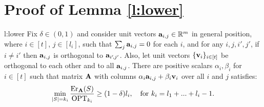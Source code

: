 \documentclass{article}
\begin{document}
\section{Proof of Lemma \ref{l:lower}}
\begin{replemma}{l:lower}
Fix $\delta\in(0,1)$ and consider unit vectors
$\mathbf a_{i,j}\in\mathbb R^m$ in general position, where $i\in[t]$, $j\in[l_i]$, such that
$\sum_j\mathbf a_{i,j}=0$ for each $i$, and for any $i,j,i',j'$, if $i\ne i'$
then $\mathbf a_{i,j}$ is orthogonal to $\mathbf a_{i'\!,j'}$. Also, let unit vectors
$\{\mathbf v_i\}_{i\in[t]}$ be orthogonal to  each other and to all
$\mathbf a_{i,j}$. There are positive scalars $\alpha_{i},\beta_i$ for $ i \in [t]$
such that matrix $\mathbf A$ with columns 
$\alpha_{i}\mathbf a_{i,j}+\beta_i\mathbf v_i$ over all $i$ and $j$ satisfies: 
\begin{align*}
  \min_{|S|=k_i}\frac{\mathrm{Er}_\mathbf A(S)}{\mathrm{OPT}_{k_i}}\geq
  (1-\delta)l_i,\quad\text{for }k_i=l_1+...+l_i-1.
\end{align*}
 \end{replemma}
\end{document}
